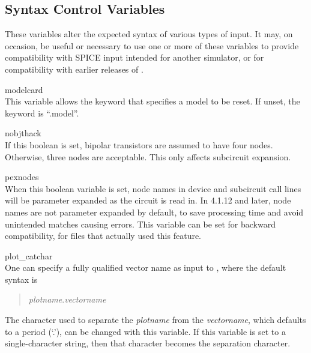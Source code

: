 \subsection{Syntax Control Variables}


These variables alter the expected syntax of various types of
{\WRspice} input.  It may, on occasion, be useful or necessary to use
one or more of these variables to provide compatibility with SPICE
input intended for another simulator, or for compatibility with
earlier releases of {\WRspice}.
 
\begin{description}
\item{\et modelcard}\\
This variable allows the keyword that specifies a model to be reset.
If unset, the keyword is ``{\vt .model}''.

\item{\et nobjthack}\\
If this boolean is set, bipolar transistors are assumed to have four
nodes.  Otherwise, three nodes are acceptable.  This only affects
subcircuit expansion.

\item{\et pexnodes}\\
When this boolean variable is set, node names in device and subcircuit
call lines will be parameter expanded as the circuit is read in.  In
4.1.12 and later, node names are not parameter expanded by default, to
save processing time and avoid unintended matches causing errors. 
This variable can be set for backward compatibility, for files that
actually used this feature.

\item{\et plot\_catchar}\\
One can specify a fully qualified vector name as input to {\WRspice},
where the default syntax is
\begin{quote}
{\it plotname\/}{\vt .}{\it vectorname}
\end{quote}

The character used to separate the {\it plotname} from the {\it
vectorname}, which defaults to a period (`{\vt .}'), can be changed
with this variable.  If this variable is set to a single-character
string, then that character becomes the separation character.


\end{description}
